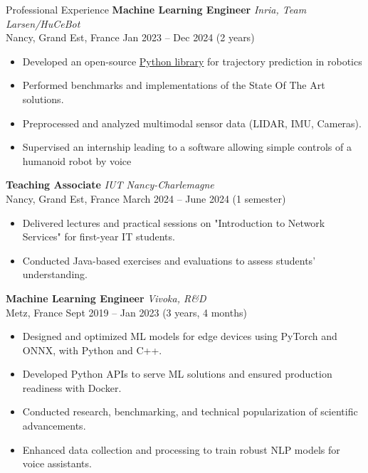 \documentclass{resume} %
\begin{document}
\begin{rSection}{Professional Experience}
\textbf{Machine Learning Engineer} \hfill \textit{Inria, Team Larsen/HuCeBot} \\
Nancy, Grand Est, France \hfill Jan 2023 -- Dec 2024 (2 years)
\begin{itemize}
    \item Developed an open-source \href{https://github.com/hucebot/prescyent}{Python library} for trajectory prediction in robotics
        \item Performed benchmarks and implementations of the State Of The Art solutions.
        \item Preprocessed and analyzed multimodal sensor data (LIDAR, IMU, Cameras).
    \item Supervised an internship leading to a software allowing simple controls of a humanoid robot by voice
\end{itemize}

\vspace{0.1cm}

\textbf{Teaching Associate} \hfill \textit{IUT Nancy-Charlemagne} \\
Nancy, Grand Est, France \hfill March 2024 -- June 2024  (1 semester)
\begin{itemize}
    \item Delivered lectures and practical sessions on "Introduction to Network Services" for first-year IT students.
    \item Conducted Java-based exercises and evaluations to assess students' understanding.
\end{itemize}

\vspace{0.1cm}

\textbf{Machine Learning Engineer} \hfill \textit{Vivoka, R\&D} \\
Metz, France \hfill Sept 2019 -- Jan 2023 (3 years, 4 months)
\begin{itemize}
    \item Designed and optimized ML models for edge devices using PyTorch and ONNX, with Python and C++.
    \item Developed Python APIs to serve ML solutions and ensured production readiness with Docker.
    \item Conducted research, benchmarking, and technical popularization of scientific advancements.
    \item Enhanced data collection and processing to train robust NLP models for voice assistants.
\end{itemize}


\end{rSection}
\end{document}
